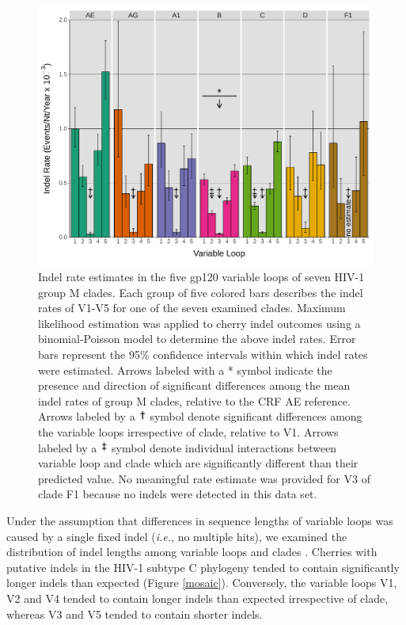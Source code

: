 \documentclass[12pt]{article}
\newcommand*{\doubledag}[2]{\includegraphics[height=#2,width=#1, trim={3cm 5cm 3cm 3cm }, clip]{doubledag-symbol.pdf}}
\newcommand*{\singledag}[2]{\includegraphics[height=#2,width=#1, trim={3cm 5cm 3cm 3cm }, clip]{singledag-symbol.pdf}}
\begin{document}
\begin{figure}[htbp]
    \centering
    \includegraphics[width=.85\textwidth]{indel-rates}
    \caption{ 
    Indel rate estimates in the five gp120 variable loops of seven HIV-1 group M clades. 
    Each group of five colored bars describes the indel rates of V1-V5 for one of the seven examined clades. 
    Maximum likelihood estimation was applied to cherry indel outcomes using a binomial-Poisson model to determine the above indel rates. 
    Error bars represent the 95\% confidence intervals within which indel rates were estimated. 
    Arrows labeled with a * symbol indicate the presence and direction of significant differences among the mean indel rates of group M clades, relative to the CRF AE reference. 
    Arrows labeled by a \protect\singledag{2.5mm}{3.5mm} symbol denote significant differences among the variable loops irrespective of clade, relative to V1.  
    Arrows labeled by a \protect\doubledag{2.5mm}{3.5mm} symbol denote individual interactions between variable loop and clade which are significantly different than their predicted value.
    No meaningful rate estimate was provided for V3 of clade F1 because no indels were detected in this data set.   
    }
    \label{indel-rates}
\end{figure}




Under the assumption that differences in sequence lengths of variable loops was caused by a single fixed indel (\textit{i.e.}, no multiple hits), we examined the distribution of indel lengths among variable loops and clades .
Cherries with putative indels in the HIV-1 subtype C phylogeny tended to contain significantly longer indels than expected (Figure \ref{mosaic}).
Conversely, the variable loops V1, V2 and V4 tended to contain longer indels than expected irrespective of clade, whereas V3 and V5 tended to contain shorter indels.
\end{document}
